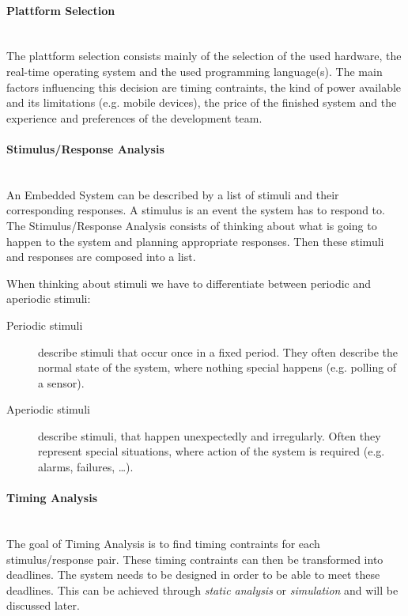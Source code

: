 \documentclass[10pt,a4paper,titlepage,draft]{article} %
\begin{document}
\paragraph{Plattform Selection} \ \\
The plattform selection consists mainly of the selection of the used hardware, the real-time operating system and the used programming language(s).
The main factors influencing this decision are timing contraints, the kind of power available and its limitations (e.g. mobile devices), the price of the finished system and the experience and preferences of the development team.

\paragraph{Stimulus/Response Analysis} \ \\
An Embedded System can be described by a list of stimuli and their corresponding responses.
A stimulus is an event the system has to respond to.
The Stimulus/Response Analysis consists of thinking about what is going to happen to the system and planning appropriate responses.
Then these stimuli and responses are composed into a list.

When thinking about stimuli we have to differentiate between periodic and aperiodic stimuli:
\begin{description}
	\item[Periodic stimuli] describe stimuli that occur once in a fixed period.
	They often describe the normal state of the system, where nothing special happens (e.g. polling of a sensor).
	\item[Aperiodic stimuli] describe stimuli, that happen unexpectedly and irregularly.
	Often they represent special situations, where action of the system is required (e.g. alarms, failures, \dots).
\end{description}

\paragraph{Timing Analysis} \ \\
The goal of Timing Analysis is to find timing contraints for each sti\-mu\-lus/re\-sponse pair.
These timing contraints can then be transformed into deadlines.
The system needs to be designed in order to be able to meet these deadlines.
This can be achieved through \emph{static analysis} or \emph{simulation} and will be discussed later.
\end{document}
